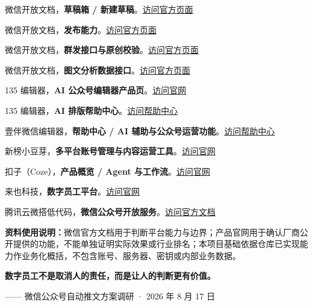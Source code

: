 \documentclass[UTF8,11pt,a4paper,fontset=none]{ctexart}
\begin{document}
\begin{enumerate}[label={\textcolor{BrandBlue}{[\arabic*]}},leftmargin=2.3em,itemsep=6pt]
  \item 微信开放文档，\textbf{草稿箱 / 新建草稿}。\href{https://developers.weixin.qq.com/doc/offiaccount/Draft_Box/Add_draft.html}{访问官方页面}
  \item 微信开放文档，\textbf{发布能力}。\href{https://developers.weixin.qq.com/doc/offiaccount/Publish/Publish.html}{访问官方页面}
  \item 微信开放文档，\textbf{群发接口与原创校验}。\href{https://developers.weixin.qq.com/doc/offiaccount/Message_Management/Batch_Sends_and_Originality_Checks.html}{访问官方页面}
  \item 微信开放文档，\textbf{图文分析数据接口}。\href{https://developers.weixin.qq.com/doc/offiaccount/Analytics/Graphic_Analysis_Data_Interface.html}{访问官方页面}
  \item 135 编辑器，\textbf{AI 公众号编辑器产品页}。\href{https://www.135editor.com/}{访问官网}
  \item 135 编辑器，\textbf{AI 排版帮助中心}。\href{https://www.135editor.com/ai_editor/ai-style/help/}{访问帮助中心}
  \item 壹伴微信编辑器，\textbf{帮助中心 / AI 辅助与公众号运营功能}。\href{https://w.yiban.io/help}{访问帮助中心}
  \item 新榜小豆芽，\textbf{多平台账号管理与内容运营工具}。\href{https://xdy.newrank.cn/}{访问官网}
  \item 扣子（Coze），\textbf{产品概览 / Agent 与工作流}。\href{https://www.coze.cn/overview}{访问官网}
  \item 来也科技，\textbf{数字员工平台}。\href{https://laiye.com/}{访问官网}
  \item 腾讯云微搭低代码，\textbf{微信公众号开放服务}。\href{https://cloud.tencent.com/document/product/1301/100187}{访问官方文档}
\end{enumerate}

\begin{tcolorbox}[colback=PaleGray,colframe=RuleGray,boxrule=.6pt,arc=2mm,left=4mm,right=4mm,top=3mm,bottom=3mm]
\textbf{资料使用说明：}微信官方文档用于判断平台能力与边界；产品官网用于确认厂商公开提供的功能，不能单独证明实际效果或行业排名；本项目基础依据仓库已实现能力作业务化概括，不包含账号、服务器、密钥或内部业务数据。
\end{tcolorbox}

\vfill
\begin{center}
{\sffamily\bfseries\color{BrandNavy}数字员工不是取消人的责任，而是让人的判断更有价值。}\par
\vspace{3mm}
{\small\sffamily\color{Muted}—— 微信公众号自动推文方案调研 · 2026 年 8 月 17 日}
\end{center}
\end{document}

